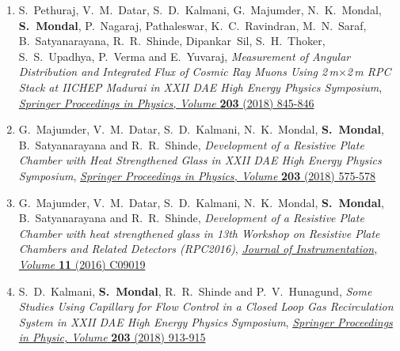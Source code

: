 \documentclass[12pt]{article}
\begin{document}
\begin{minipage}{1.05\textwidth}
\begin{enumerate}[b.]
\begin{enumerate}[1.]
    \item S.~Pethuraj, V.~M.~Datar, S.~D.~Kalmani, G.~Majumder, N.~K.~Mondal, {\bf S.~Mondal}, P.~Nagaraj, Pathaleswar, K.~C.~Ravindran, M.~N.~Saraf, B.~Satyanarayana, R.~R.~Shinde, Dipankar~Sil, S.~H.~Thoker, S.~S.~Upadhya, P.~Verma and E.~Yuvaraj, \emph{Measurement of Angular Distribution and Integrated Flux of Cosmic Ray Muons Using 2\,m$\times$2\,m RPC Stack at IICHEP Madurai in XXII DAE High Energy Physics Symposium}, \href{https://doi.org/10.1007/978-3-319-73171-1_205}{\emph{Springer Proceedings in Physics,} \emph{Volume} \textbf{203} (2018) 845-846}
    \item G.~Majumder, V.~M.~Datar, S.~D.~Kalmani, N.~K.~Mondal, {\bf S.~Mondal}, B.~Satyanarayana and R.~R.~Shinde, \emph{Development of a Resistive Plate Chamber with Heat Strengthened Glass in XXII DAE High Energy Physics Symposium}, \href{https://doi.org/10.1007/978-3-319-73171-1_135}{\emph{Springer Proceedings in Physics, Volume} \textbf{203} (2018) 575-578}
    \item  G.~Majumder, V.~M.~Datar, S.~D.~Kalmani, N.~K.~Mondal, {\bf S.~Mondal}, B.~Satyanarayana and R.~R.~Shinde, \emph{Development of a Resistive Plate Chamber with heat strengthened glass in 13th Workshop on Resistive Plate Chambers and Related Detectors (RPC2016)}, \href{https://doi.org/10.1088/1748-0221/11/09/C09019}{\emph{Journal of Instrumentation, Volume} \textbf{11} (2016) C09019}
    \item S.~D.~Kalmani, {\bf S.~Mondal}, R.~R.~Shinde and P.~V.~Hunagund, \emph{Some Studies Using Capillary for Flow Control in a Closed Loop Gas Recirculation System in XXII DAE High Energy Physics Symposium}, \href{https://doi.org/10.1007/978-3-319-73171-1_223}{\emph{Springer Proceedings in Physic, Volume} \textbf{203} (2018) 913-915}
    \end{enumerate}
  \end{enumerate}
\end{minipage}
\newpage
\end{document}
